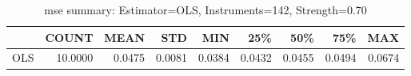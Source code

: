 \begin{table}[ht]
\centering
\caption{mse summary: Estimator=OLS, Instruments=142, Strength=0.70}
\begin{tabular}{lrrrrrrrr}
\toprule
 & COUNT & MEAN & STD & MIN & 25\% & 50\% & 75\% & MAX \\
\midrule
OLS & 10.0000 & 0.0475 & 0.0081 & 0.0384 & 0.0432 & 0.0455 & 0.0494 & 0.0674 \\
\bottomrule
\end{tabular}
\end{table}
